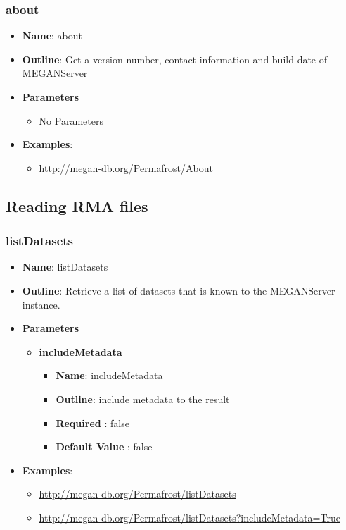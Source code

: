 \documentclass[11pt]{article}
\begin{document}
\subsubsection{about}

\begin{itemize}
	\item \textbf{Name}: about
	\item \textbf{Outline}: Get a version number, contact information and build date of MEGANServer
	\item \textbf{Parameters}
		\begin{itemize}
			\item No Parameters
		\end{itemize}
	\item \textbf{Examples}:
		\begin{itemize}
			\item \url{http://megan-db.org/Permafrost/About}
		\end{itemize}
\end{itemize}

\subsection{Reading RMA files}

\subsubsection{listDatasets}
\begin{itemize}
	\item \textbf{Name}: listDatasets
	\item \textbf{Outline}: Retrieve a list of datasets that is known to the MEGANServer instance.
	\item \textbf{Parameters}
		\begin{itemize}
			\item \textbf{includeMetadata}
				\begin{itemize}
					\item \textbf{Name}: includeMetadata
					\item \textbf{Outline}: include metadata to the result
					\item \textbf{Required} : false
					\item \textbf{Default Value} : false
				\end{itemize}
		\end{itemize}
	\item \textbf{Examples}:
		\begin{itemize}
			\item \url{http://megan-db.org/Permafrost/listDatasets}
			\item \url{http://megan-db.org/Permafrost/listDatasets?includeMetadata=True}
		\end{itemize}
\end{itemize}
\end{document}
